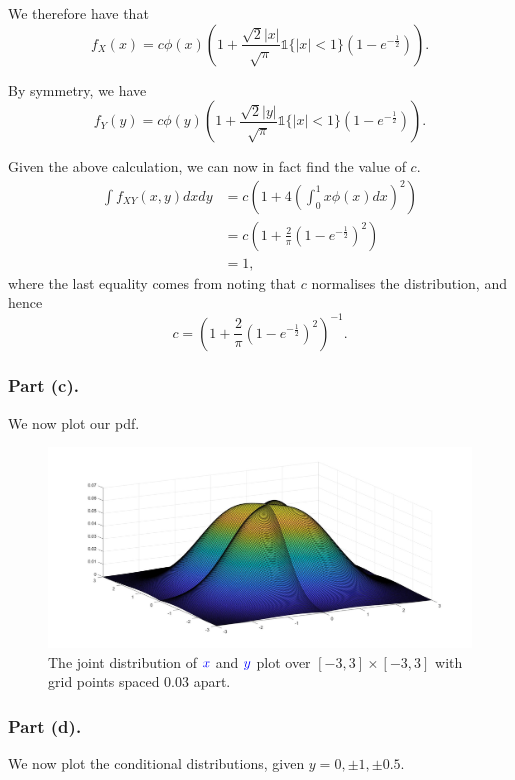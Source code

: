 \documentclass{article}
\renewcommand{\r}[1]{\textcolor{blue}{#1}}
\begin{document}
We therefore have that
\begin{equation} f_{X}(x) = c\phi(x)\left(1+\frac{\sqrt{2}|x|}{\sqrt{\pi}}\mathds{1}\{|x|<1\}(1-e^{-\frac{1}{2}})\right).\end{equation}

By symmetry, we have
\begin{equation} f_{Y}(y) = c\phi(y)\left(1+\frac{\sqrt{2}|y|}{\sqrt{\pi}}\mathds{1}\{|x|<1\}(1-e^{-\frac{1}{2}})\right).\end{equation}

Given the above calculation, we can now in fact find the value of $c$. 
\begin{equation}\begin{split}
\int f_{XY}(x,y)dxdy&=c\left(1+4\left(\int_{0}^{1}x\phi(x)dx\right)^{2}\right)\\
&= c\left(1+\frac{2}{\pi}(1-e^{-\frac{1}{2}})^{2}\right)\\
&=1,
\end{split}\end{equation}
where the last equality comes from noting that $c$ normalises the distribution, and hence
\begin{equation} c=\left(1+\frac{2}{\pi}(1-e^{-\frac{1}{2}})^{2}\right)^{-1}.\end{equation}

\subsubsection{Part (c).}
We now plot our pdf.

\begin{figure}[h]
\centering
\includegraphics[width=13cm]{q8fpartc.jpeg}
\caption{The joint distribution of $\r{x}$ and $\r{y}$ plot over $[-3,3]\times[-3,3]$ with grid points spaced 0.03 apart.}
\label{fig:8fc}
\end{figure} 

\subsubsection{Part (d).}
We now plot the conditional distributions, given $y=0,\pm1,\pm0.5$.
\end{document}
